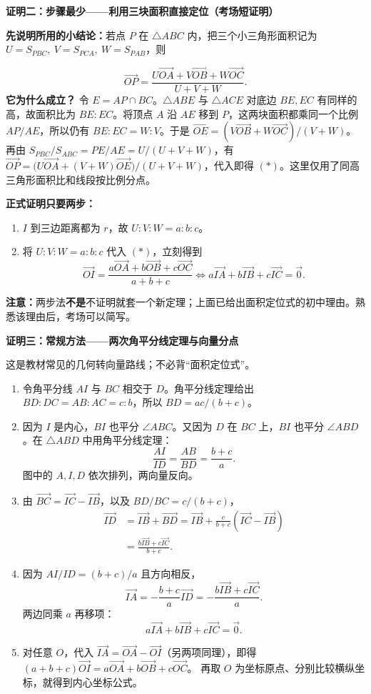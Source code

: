 \begin{proofbox}
\textbf{证明二：步骤最少——利用三块面积直接定位（考场短证明）}

\textbf{先说明所用的小结论：}若点 $P$ 在 $\triangle ABC$ 内，把三个小三角形面积记为
$U=S_{PBC},\ V=S_{PCA},\ W=S_{PAB}$，则

\[
\vec{OP}=\frac{U\vec{OA}+V\vec{OB}+W\vec{OC}}{U+V+W}.
\tag{*}
\]
\textbf{它为什么成立？} 令 $E=AP\cap BC$。$\triangle ABE$ 与 $\triangle ACE$ 对底边 $BE,EC$ 有同样的高，故面积比为 $BE:EC$。将顶点 $A$ 沿 $AE$ 移到 $P$，这两块面积都乘同一个比例 $AP/AE$，所以仍有 $BE:EC=W:V$。于是 $\vec{OE}=(V\vec{OB}+W\vec{OC})/(V+W)$。再由 $S_{PBC}/S_{ABC}=PE/AE=U/(U+V+W)$，有
$\vec{OP}=\bigl(U\vec{OA}+(V+W)\vec{OE}\bigr)/(U+V+W)$，代入即得 $(*)$。这里仅用了同高三角形面积比和线段按比例分点。

\textbf{正式证明只要两步：}
\begin{enumerate}
\item $I$ 到三边距离都为 $r$，故 $U:V:W=a:b:c$。
\item 将 $U:V:W=a:b:c$ 代入 $(*)$，立刻得到
\[
\vec{OI}=\frac{a\vec{OA}+b\vec{OB}+c\vec{OC}}{a+b+c}
\iff a\vec{IA}+b\vec{IB}+c\vec{IC}=\vec0.
\]
\end{enumerate}
\textbf{注意：}两步法\textbf{不是}不证明就套一个新定理；上面已给出面积定位式的初中理由。熟悉该理由后，考场可以简写。
\end{proofbox}

\begin{proofbox}
\textbf{证明三：常规方法——两次角平分线定理与向量分点}

这是教材常见的几何转向量路线；不必背“面积定位式”。
\begin{enumerate}
\item 令角平分线 $AI$ 与 $BC$ 相交于 $D$。角平分线定理给出
$BD:DC=AB:AC=c:b$，所以 $BD=ac/(b+c)$。
\item 因为 $I$ 是内心，$BI$ 也平分 $\angle ABC$。又因为 $D$ 在 $BC$ 上，$BI$ 也平分 $\angle ABD$。在 $\triangle ABD$ 中用角平分线定理：
\[
\frac{AI}{ID}=\frac{AB}{BD}=
\frac{b+c}{a}.
\]
图中的 $A,I,D$ 依次排列，两向量反向。
\item 由 $\vec{BC}=\vec{IC}-\vec{IB}$，以及 $BD/BC=c/(b+c)$，
\[
\begin{aligned}
\vec{ID}&=\vec{IB}+\vec{BD}=\vec{IB}+\frac{c}{b+c}(\vec{IC}-\vec{IB})\\
&=\frac{b\vec{IB}+c\vec{IC}}{b+c}.
\end{aligned}
\]
\item 因为 $AI/ID=(b+c)/a$ 且方向相反，
\[
\vec{IA}=-\frac{b+c}{a}\vec{ID}
=-\frac{b\vec{IB}+c\vec{IC}}{a}.
\]
两边同乘 $a$ 再移项：
\[\boxed{a\vec{IA}+b\vec{IB}+c\vec{IC}=\vec0}.\]
\item 对任意 $O$，代入 $\vec{IA}=\vec{OA}-\vec{OI}$（另两项同理），即得
$(a+b+c)\vec{OI}=a\vec{OA}+b\vec{OB}+c\vec{OC}$。
再取 $O$ 为坐标原点、分别比较横纵坐标，就得到内心坐标公式。
\end{enumerate}
\end{proofbox}

